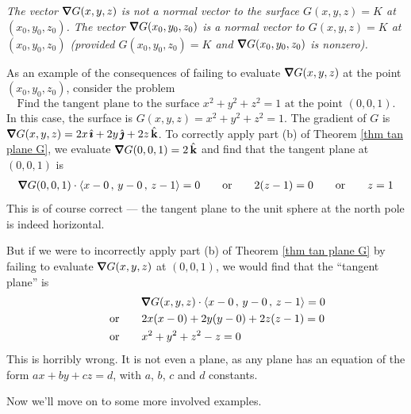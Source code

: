 \begin{warning}\label{warn tan plane}
\emph{The vector $\vnabla G(x,y,z)$ is not a normal vector to the surface
$G(x,y,z)\!=\!K$ at $(x_0,y_0,z_0)$. The vector  $\vnabla G(x_0,y_0,z_0)$ is
a normal vector to $G(x,y,z)\!=\!K$ at $(x_0,y_0,z_0)$
(provided $G(x_0,y_0,z_0)=K$ and $\vnabla G(x_0,y_0,z_0)$ is nonzero).}

\medskip

As an example of the consequences of failing to evaluate 
$\vnabla G(x,y,z)$ at the point $(x_0,y_0,z_0)$, consider the problem 
\begin{equation*}
\text{Find the tangent plane to the surface 
$x^2+y^2+z^2=1$ at the point $(0,0,1)$.}
\end{equation*}
 In this case,
the surface is $G(x,y,z)=x^2+y^2+z^2=1$. The gradient of $G$ is
$\vnabla G(x,y,z) = 2x\,\hi +2y\,\hj +2z\,\hk$. To correctly apply part (b) 
of Theorem \ref{thm tan plane G}, we evaluate
$\vnabla G(0,0,1) = 2\,\hk$ and find that the tangent plane at $(0,0,1)$ is
\begin{align*}
\vnabla G(0,0,1)\cdot\llt x-0\,,\,y-0\,,\,z-1\rgt =0
\qquad\text{or}\qquad 2(z-1)=0
\qquad\text{or}\qquad z=1
\end{align*}
This is of course correct --- the tangent plane to the unit sphere at the north
pole is indeed horizontal.

\medskip
But if we were to incorrectly apply part (b) of Theorem \ref{thm tan plane G} 
by failing to evaluate $\vnabla G(x,y,z)$ at $(0,0,1)$, we would find that 
the ``tangent plane'' is
\begin{align*}
&\vnabla G(x,y,z)\cdot\llt x-0\,,\,y-0\,,\,z-1\rgt =0 \\
\qquad\text{or}\qquad &2x(x-0) +2y(y-0) + 2z(z-1)=0 \\
\qquad\text{or}\qquad & x^2+y^2+z^2 -z = 0
\end{align*}
This is horribly wrong. It is not even a plane, as any plane has
an equation of the form $ax+by+cz=d$, with $a$, $b$, $c$ and $d$ constants.

\end{warning}

Now we'll move on to some more involved examples.



